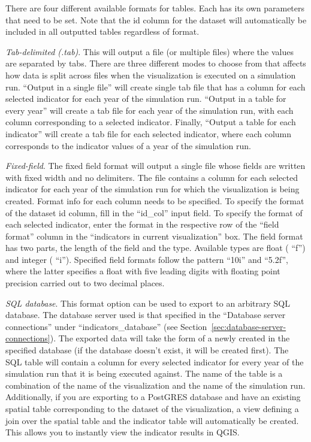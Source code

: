 There are four different available formats for tables. Each has its
own parameters that need to be set. Note that the id column for the
dataset will automatically be included in all outputted tables
regardless of format.

\emph{Tab-delimited (.tab)}. This will output a file (or multiple
files) where the values are separated by tabs. There are three
different modes to choose from that affects how data is split across
files when the visualization is executed on a simulation run.
``Output in a single file'' will create single tab file that has a
column for each selected indicator for each year of the simulation
run. ``Output in a table for every year'' will create a tab file
for each year of the simulation run, with each column
corresponding to a selected indicator. Finally, 
``Output a table for each indicator'' will create a tab file for
each selected indicator, where each column
corresponds to the indicator values of a year of the
simulation run.

\emph{Fixed-field}. The fixed field format will output a single file
whose fields are written with fixed width and no delimiters. The file
contains a column for each selected indicator for each year of the
simulation run for which the visualization is being created. Format
info for each column needs to be specified. To specify the format of
the dataset id column, fill in the ``id\_col'' input field. To
specify the format of each selected indicator, enter the format in the
respective row of the ``field format'' column in the  ``indicators in
current visualization'' box. The field format has two parts, the length
of the field and the type. Available types are float ( ``f'') and
integer ( ``i''). Specified field formats follow the pattern  ``10i'' and
 ``5.2f'', where the latter specifies a float with five leading digits
with floating point precision carried out to two decimal places.

\emph{SQL database}. This format option can be used to export to an
arbitrary SQL database. The database server used is that specified in
the ``Database server connections'' under  ``indicators\_database''
(see Section~\ref{sec:database-server-connections}). The exported data
will take the form of a newly created in the specified database (if the database doesn't exist, it will be created
first). The SQL table will contain a column for every selected
indicator for every year of the simulation run that it is being
executed against. The name of the table is a combination of the name of
the visualization and the name of the simulation run. Additionally,
if you are exporting to a PostGRES database and have an existing
spatial table corresponding to the dataset of the visualization, a view
defining a join over the spatial table and the indicator table will
automatically be created. This allows you to instantly view the
indicator results in QGIS. 

